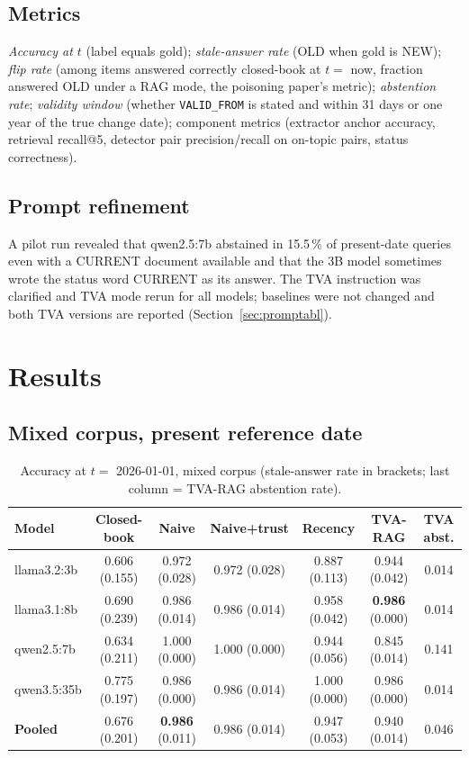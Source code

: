 \documentclass[11pt,a4paper]{report}
\begin{document}
\section{Metrics}
\emph{Accuracy at $t$} (label equals gold); \emph{stale-answer rate} (OLD when gold is NEW); \emph{flip rate} (among items answered correctly closed-book at $t=$ now, fraction answered OLD under a RAG mode, the poisoning paper's metric); \emph{abstention rate}; \emph{validity window} (whether \texttt{VALID\_FROM} is stated and within 31 days or one year of the true change date); component metrics (extractor anchor accuracy, retrieval recall@5, detector pair precision/recall on on-topic pairs, status correctness).

\section{Prompt refinement}
A pilot run revealed that qwen2.5:7b abstained in 15.5\,\% of present-date queries even with a CURRENT document available and that the 3B model sometimes wrote the status word CURRENT as its answer. The TVA instruction was clarified and TVA mode rerun for all models; baselines were not changed and both TVA versions are reported (Section~\ref{sec:promptabl}).

\chapter{Results}
\section{Mixed corpus, present reference date}
\begin{table}[htbp]\centering\caption{Accuracy at $t=$ 2026-01-01, mixed corpus (stale-answer rate in brackets; last column = TVA-RAG abstention rate).}
\label{tab:now}\footnotesize\setlength{\tabcolsep}{4pt}
\begin{tabular}{l c c c c c c}\toprule\rowcolor{cIngest}\textbf{Model}&\textbf{Closed-book}&\textbf{Naive}&\textbf{Naive+trust}&\textbf{Recency}&\textbf{TVA-RAG}&\textbf{TVA abst.}\\\midrule
llama3.2:3b & 0.606 (0.155) & 0.972 (0.028) & 0.972 (0.028) & 0.887 (0.113) & 0.944 (0.042) & 0.014\\
llama3.1:8b & 0.690 (0.239) & 0.986 (0.014) & 0.986 (0.014) & 0.958 (0.042) & \textbf{0.986} (0.000) & 0.014\\
qwen2.5:7b  & 0.634 (0.211) & 1.000 (0.000) & 1.000 (0.000) & 0.944 (0.056) & 0.845 (0.014) & 0.141\\
qwen3.5:35b & 0.775 (0.197) & 0.986 (0.000) & 0.986 (0.014) & 1.000 (0.000) & 0.986 (0.000) & 0.014\\\midrule
\rowcolor{cNew}\textbf{Pooled} & 0.676 (0.201) & \textbf{0.986} (0.011) & 0.986 (0.014) & 0.947 (0.053) & 0.940 (0.014) & 0.046\\\bottomrule\end{tabular}
\end{table}
\end{document}
